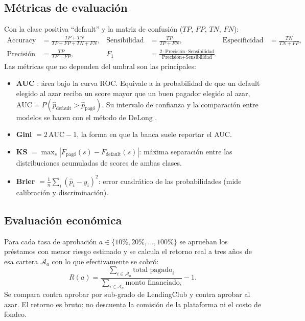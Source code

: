 \documentclass{article}
\begin{document}
\subsection{Métricas de evaluación}
Con la clase positiva ``default'' y la matriz de confusión ($TP$, $FP$, $TN$,
$FN$):
\begin{align}
\text{Accuracy} &= \frac{TP+TN}{TP+FP+TN+FN}, &
\text{Sensibilidad} &= \frac{TP}{TP+FN}, &
\text{Especificidad} &= \frac{TN}{TN+FP}, \\
\text{Precisión} &= \frac{TP}{TP+FP}, &
F_1 &= \frac{2 \cdot \text{Precisión}\cdot\text{Sensibilidad}}{\text{Precisión}+\text{Sensibilidad}} .
\end{align}
Las métricas que no dependen del umbral son las principales:
\begin{itemize}
  \item \textbf{AUC} \cite{fawcett2006}: área bajo la curva ROC. Equivale a la
        probabilidad de que un default elegido al azar reciba un score mayor que
        un buen pagador elegido al azar, $\text{AUC}=P(\hat p_{\text{default}} > \hat p_{\text{pagó}})$.
        Su intervalo de confianza y la comparación entre modelos se hacen con el
        método de DeLong \cite{delong1988,robin2011}.
  \item \textbf{Gini} $= 2\,\text{AUC} - 1$, la forma en que la banca suele
        reportar el AUC.
  \item \textbf{KS} $= \max_s |F_{\text{pagó}}(s) - F_{\text{default}}(s)|$: máxima
        separación entre las distribuciones acumuladas de scores de ambas clases.
  \item \textbf{Brier} \cite{brier1950} $= \frac{1}{n}\sum_i (\hat p_i - y_i)^2$:
        error cuadrático de las probabilidades (mide calibración y discriminación).
\end{itemize}

\subsection{Evaluación económica}
\label{sec:met-eco}
Para cada tasa de aprobación $a \in \{10\%, 20\%, \dots, 100\%\}$ se aprueban los
préstamos con menor riesgo estimado y se calcula el retorno real a tres años de
esa cartera $\mathcal{A}_a$ con lo que efectivamente se cobró:
\begin{equation}
R(a) = \frac{\sum_{i \in \mathcal{A}_a} \text{total pagado}_i}{\sum_{i \in \mathcal{A}_a} \text{monto financiado}_i} - 1 .
\end{equation}
Se compara contra aprobar por sub-grado de LendingClub y contra aprobar al azar.
El retorno es bruto: no descuenta la comisión de la plataforma ni el costo de
fondeo.
\end{document}
